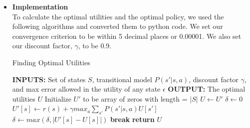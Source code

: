 \documentclass{article}
\begin{document}
\begin{itemize}
\begin{center}
            \end{center}
        \clearpage
        \item \textbf{Implementation}\\
            To calculate the optimal utilities and the optimal policy, we used the following algorithms
            and converted them to python code. We set our convergence criterion to be within
            5 decimal places or 0.00001. We also set our discount factor, $\gamma$, to be 0.9.
            \begin{algorithm}
            \caption{Finding Optimal Utilities}
            \begin{algorithmic}
                \STATE \textbf{INPUTS:} Set of states $S$, transitional model $P(s'|s,a)$,
                    discount factor $\gamma$, and max error allowed in the utility of any state $\epsilon$
                \STATE \textbf{OUTPUT:} The optimal utilities $U$
                \STATE{}
                \STATE Initialize $U'$ to be array of zeros with length = $|S|$
                    \STATE $U \leftarrow U'$
                    \STATE $\delta \leftarrow 0$
                        \STATE $U'[s] \leftarrow r(s) + \gamma max_a\sum_{s'}P(s'|s, a)U[s']$
                        \STATE $\delta \leftarrow max(\delta, |U'[s] - U[s]|)$
                    \ENDFOR
                        \STATE \textbf{break}
                    \ENDIF
                \ENDWHILE
                \STATE \textbf{return} $U$
            \end{algorithmic}
            \end{algorithm}
            

\end{itemize}
\end{document}
